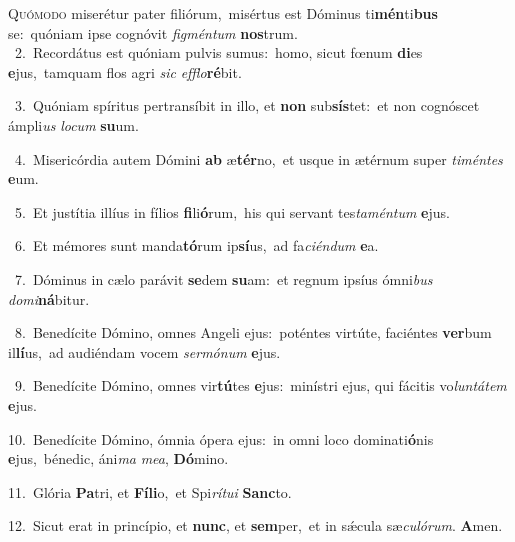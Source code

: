 \lettrine{\initial\textcolor{\initialcolor}{Q}}{uómodo} miserétur pater filiórum,~\dagger misértus est Dóminus ti\-\textbf{mén}\-ti\textbf{bus} se:~\star quóniam ipse cognóvit \textit{fig}\-\textit{mén}\textit{tum} \textbf{nos}\-trum.\\
{\numbfont\textcolor{\numbcolor}{~2.}}~Recordátus est quóniam pulvis sumus:~\dagger homo, sicut fœnum \textbf{di}\-es \textbf{e}\-jus,~\star tamquam flos agri \textit{sic} \textit{ef}\-\textit{flo}\textbf{ré}bit.\par
{\numbfont\textcolor{\numbcolor}{~3.}}~Quóniam spíritus pertransíbit in illo, et \textbf{non} sub\-\textbf{sís}\-tet:~\star et non cognóscet ámpli\textit{us} \textit{lo}\-\textit{cum} \textbf{su}\-um.\par
{\numbfont\textcolor{\numbcolor}{~4.}}~Misericórdia autem Dómini \textbf{ab} æ\-\textbf{tér}\-no,~\star et usque in ætérnum super \textit{ti}\-\textit{mén}\textit{tes} \textbf{e}\-um.\par
{\numbfont\textcolor{\numbcolor}{~5.}}~Et justítia illíus in fílios \textbf{fi}\-li\-\textbf{ó}\-rum,~\star his qui servant tes\-\textit{ta}\-\textit{mén}\textit{tum} \textbf{e}\-jus.\par
{\numbfont\textcolor{\numbcolor}{~6.}}~Et mémores sunt manda\-\textbf{tó}\-rum ip\-\textbf{sí}\-us,~\star ad fa\-\textit{ci}\-\textit{én}\textit{dum} \textbf{e}\-a.\par
{\numbfont\textcolor{\numbcolor}{~7.}}~Dóminus in cælo parávit \textbf{se}\-dem \textbf{su}\-am:~\star et regnum ipsíus ómni\textit{bus} \textit{do}\-\textit{mi}\textbf{ná}bitur.\par
{\numbfont\textcolor{\numbcolor}{~8.}}~Benedícite Dómino, omnes Angeli ejus:~\dagger poténtes virtúte, faciéntes \textbf{ver}\-bum il\-\textbf{lí}\-us,~\star ad audiéndam vocem \textit{ser}\-\textit{mó}\textit{num} \textbf{e}\-jus.\par
{\numbfont\textcolor{\numbcolor}{~9.}}~Benedícite Dómino, omnes vir\-\textbf{tú}\-tes \textbf{e}\-jus:~\star minístri ejus, qui fácitis vo\-\textit{lun}\-\textit{tá}\textit{tem} \textbf{e}\-jus.\par
{\numbfont\textcolor{\numbcolor}{10.}}~Benedícite Dómino, ómnia ópera ejus:~\dagger in omni loco dominati\-\textbf{ó}\-nis \textbf{e}\-jus,~\star bénedic, áni\textit{ma} \textit{me}\-\textit{a}, \textbf{Dó}\-mino.\par
{\numbfont\textcolor{\numbcolor}{11.}}~Glória \textbf{Pa}\-tri, et \textbf{Fí}\-\textbf{li}o,~\star et Spi\-\textit{rí}\-\textit{tu}\textit{i} \textbf{Sanc}\-to.\par
{\numbfont\textcolor{\numbcolor}{12.}}~Sicut erat in princípio, et \textbf{nunc}\-, et \textbf{sem}\-per,~\star et in sǽcula sæ\-\textit{cu}\-\textit{ló}\textit{rum}. \textbf{A}\-men.\par
